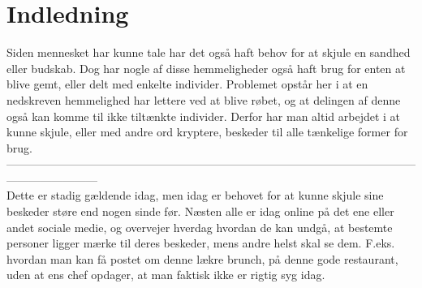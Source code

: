 \section{Indledning}
Siden mennesket har kunne tale har det også haft behov for at skjule en sandhed eller budskab. Dog har nogle af disse hemmeligheder også haft brug for enten at blive gemt, eller delt med enkelte individer. Problemet opstår her i at en nedskreven hemmelighed har lettere ved at blive røbet, og at delingen af denne også kan komme til ikke tiltænkte individer.
Derfor har man altid arbejdet i at kunne skjule, eller med andre ord kryptere, beskeder til alle tænkelige former for brug. \\
\noindent
------------------------------------------------------------------------------------------------------------------------------------\\
\noindent
Dette er stadig gældende idag, men idag er behovet for at kunne skjule sine beskeder støre end nogen sinde før. Næsten alle er idag online på det ene eller andet sociale medie, og overvejer hverdag hvordan de kan undgå, at bestemte personer ligger mærke til deres beskeder, mens andre helst skal se dem. F.eks. hvordan man kan få postet om denne lækre brunch, på denne gode restaurant, uden at ens chef opdager, at man faktisk ikke er rigtig syg idag.

